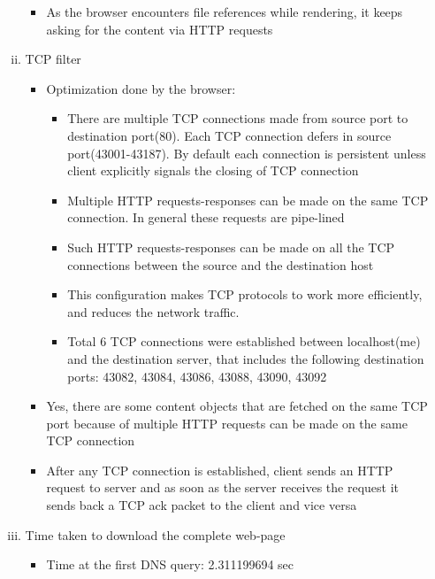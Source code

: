 \documentclass{article}
\begin{document}
\begin{enumerate}[a)]
\begin{enumerate}[i)]
\begin{itemize}
                        \item As the browser encounters file references while rendering, it keeps asking for the content via HTTP requests
                    \end{itemize}{}
                \item TCP filter
                    \begin{itemize}
                        \item Optimization done by the browser:
                        \begin{itemize}
                            \item There are multiple TCP connections made from source port to destination port(80). Each TCP connection defers in source port(43001-43187). By default each connection is persistent unless client explicitly signals the closing of TCP connection \item Multiple HTTP requests-responses can be made on the same TCP connection. In general these requests are pipe-lined
                            \item Such HTTP requests-responses can be made on all the TCP connections between the source and the destination host
                            \item This configuration makes TCP protocols to work more efficiently, and reduces the network traffic.
                            \item Total 6 TCP connections were established between localhost(me) and the destination server, that includes the following destination ports: 43082, 43084, 43086, 43088, 43090, 43092
                        \end{itemize}{}
                        \item Yes, there are some content objects that are fetched on the same TCP port because of multiple HTTP requests can be made on the same TCP connection
                        \item After any TCP connection is established, client sends an HTTP request to server and as soon as the server receives the request it sends back a TCP ack packet to the client and vice versa
                    \end{itemize}{}
                \item Time taken to download the complete web-page
                    \begin{itemize}
                        \item Time at the first DNS query: 2.311199694 sec

\end{itemize}
\end{enumerate}
\end{enumerate}
\end{document}
